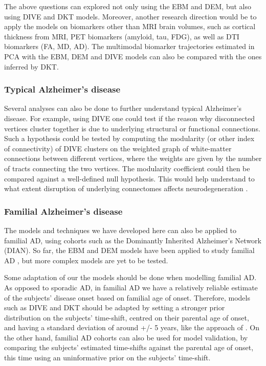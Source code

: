  The above questions can explored not only using the EBM and DEM, but also using DIVE and DKT models. Moreover, another research direction would be to apply the models on biomarkers other than MRI brain volumes, such as cortical thickness from MRI, PET biomarkers (amyloid, tau, FDG), as well as DTI biomarkers (FA, MD, AD). The multimodal biomarker trajectories estimated in PCA with the EBM, DEM and DIVE models can also be compared with the ones inferred by DKT. 

\subsubsection{Typical Alzheimer's disease}

Several analyses can also be done to further understand typical Alzheimer's disease. For example, using DIVE one could test if the reason why disconnected vertices cluster together is due to underlying structural or functional connections. Such a hypothesis could be tested by computing the modularity (or other index of connectivity) of DIVE clusters on the weighted graph of white-matter connections between different vertices, where the weights are given by the number of tracts connecting the two vertices. The modularity coefficient could then be compared against a well-defined null hypothesis. This would help understand to what extent disruption of underlying connectomes affects neurodegeneration \cite{seeley2009neurodegenerative}. 


\subsubsection{Familial Alzheimer's disease}

The models and techniques we have developed here can also be applied to familial AD, using cohorts such as the Dominantly Inherited Alzheimer's Network (DIAN). So far, the EBM and DEM models have been applied to study familial AD \cite{oxtoby2018}, but more complex models are yet to be tested. 

Some adaptation of our the models should be done when modelling familial AD. As opposed to sporadic AD, in familial AD we have a relatively reliable estimate of the subjects' disease onset based on familial age of onset. Therefore, models such as DIVE and DKT should be adapted by setting a stronger prior distribution on the subjects' time-shift, centred on their parental age of onset, and having a standard deviation of around +/- 5 years, like the approach of \cite{oxtoby2018}. On the other hand, familial AD cohorts can also be used for model validation, by comparing the subjects' estimated time-shifts against the parental age of onset, this time using an uninformative prior on the subjects' time-shift.

